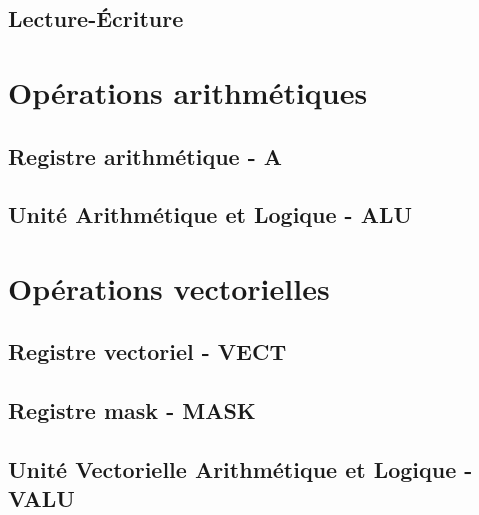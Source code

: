 \documentclass{scrreprt}
\begin{document}
    	\section{Lecture-Écriture}
    	
    	
    	
    \chapter{Opérations arithmétiques}	
    	
    	\section{Registre arithmétique - A}
    	
    	\section{Unité Arithmétique et Logique - ALU}
    	
    \chapter{Opérations vectorielles}
    	
    	\section{Registre vectoriel - VECT}
    	
    	\section{Registre mask - MASK}
    	
    	\section{Unité Vectorielle Arithmétique et Logique - VALU}
    		
\end{document}
